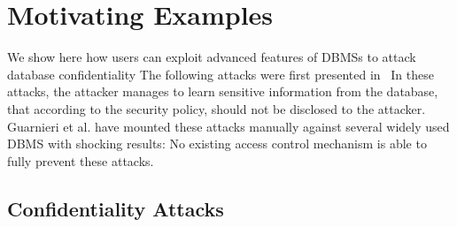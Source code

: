 \section{Motivating Examples}

We show here how users can exploit advanced features of DBMSs to attack database confidentiality
%
The following attacks were first presented in~\cite{guarnieri2016strong}
%
In these attacks, the attacker manages to learn sensitive information from the database, that according to the security policy, should not be disclosed to the attacker.
%
Guarnieri et al. have mounted these attacks manually against several widely used DBMS with shocking results: No existing access control mechanism is able to fully prevent these attacks.

\subsection{Confidentiality Attacks}

